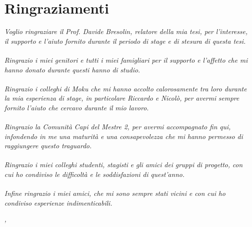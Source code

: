 \cleardoublepage
{}

\begingroup
\let\clearpage\relax
\let\cleardoublepage\relax
\let\cleardoublepage\relax

\chapter*{Ringraziamenti}
\textit{Voglio ringraziare il Prof. Davide Bresolin, relatore della mia tesi, per l'interesse, il supporto e l'aiuto fornito durante il periodo di stage e di stesura di questa tesi.} \\
\\
\textit{Ringrazio i miei genitori e tutti i miei famigliari per il supporto e l'affetto che mi hanno donato durante questi hanno di studio.} \\
\\
\textit{Ringrazio i colleghi di Moku che mi hanno accolto calorosamente tra loro durante la mia esperienza di stage, in particolare Riccardo e Nicolò, per avermi sempre fornito l'aiuto che cercavo durante il mio lavoro.} \\
\\
\textit{Ringrazio la Comunità Capi del Mestre 2, per avermi accompagnato fin qui, infondendo in me una maturità e una consapevolezza che mi hanno permesso di raggiungere questo traguardo.} \\
\\
\textit{Ringrazio i miei colleghi studenti, stagisti e gli amici dei gruppi di progetto, con cui ho condiviso le difficoltà e le soddisfazioni di quest'anno.} \\
\\
\textit{Infine ringrazio i miei amici, che mi sono sempre stati vicini e con cui ho condiviso esperienze indimenticabili.} \\
\bigskip

\noindent\textit{\myLocation, \myTime}
\hfill \myName

\endgroup
